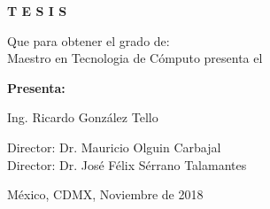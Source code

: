 \vfill
\begin{center}
    \Large\bfseries
   T E S I S
\end{center}

\vfill
\begin{center}
    \large
   Que para obtener el grado de: \\
Maestro en Tecnologia de C\'omputo  presenta el
\end{center}

\vfill
\begin{center}
    \large\bfseries
    Presenta:
    
   Ing. Ricardo Gonz\'alez Tello
\end{center}

\vfill\vfill\vfill
\begin{center}
    \large
    Director: Dr. Mauricio Olguin Carbajal\\
    Director: Dr. Jos\'e F\'elix S\'errano Talamantes
\end{center}

\vfill
\begin{center}
\large
    M\'exico, CDMX, \hfill Noviembre de 2018
\end{center}

\cleardoublepage


%


%

\cleardoublepage

\rmfamily
\normalfont

\pagestyle{headings}
\tableofcontents

